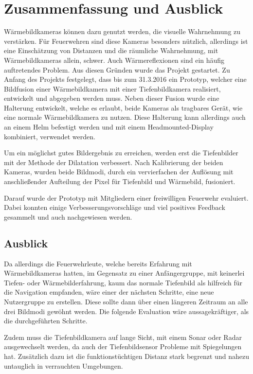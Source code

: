 
\chapter{Zusammenfassung und Ausblick}\label{chap:zusfas}
Wärmebildkameras können dazu genutzt werden, die visuelle Wahrnehmung zu verstärken.
Für Feuerwehren sind diese Kameras besonders nützlich, allerdings ist eine Einschätzung von Distanzen und die räumliche Wahrnehmung, mit Wärmebildkameras allein, schwer.
Auch Wärmereflexionen sind ein häufig auftretendes Problem.
Aus diesen Gründen wurde das Projekt \profire gestartet.
Zu Anfang des Projekts \profire festgelegt, dass bis zum 31.3.2016 ein Prototyp, welcher eine Bildfusion einer Wärmebildkamera mit einer Tiefenbildkamera realisiert, entwickelt und abgegeben werden muss.
Neben dieser Fusion wurde eine Halterung entwickelt, welche es erlaubt, beide Kameras als tragbares Gerät, wie eine normale Wärmebildkamera zu nutzen.
Diese Halterung kann allerdings auch an einem Helm befestigt werden und mit einem Headmounted-Display kombiniert, verwendet werden.

Um ein möglichst gutes Bildergebnis zu erreichen, werden erst die Tiefenbilder mit der Methode der Dilatation verbessert.
Nach Kalibrierung der beiden Kameras, wurden beide Bildmodi, durch ein vervierfachen der Auflösung mit anschließender Aufteilung der Pixel für Tiefenbild und Wärmebild, fusioniert.

Darauf wurde der Prototyp mit Mitgliedern einer freiwilligen Feuerwehr evaluiert.
Dabei konnten einige Verbesserungsvorschläge und viel positives Feedback gesammelt und auch nachgewiesen werden.

\section*{Ausblick}
Da allerdings die Feuerwehrleute, welche bereits Erfahrung mit Wärmebildkameras hatten, im Gegensatz zu einer Anfängergruppe, mit keinerlei Tiefen- oder Wärmebilderfahrung, kaum das normale Tiefenbild als hilfreich für die Navigation empfanden, wäre einer der nächsten Schritte, eine neue Nutzergruppe zu erstellen.
Diese sollte dann über einen längeren Zeitraum an alle drei Bildmodi gewöhnt werden.
Die folgende Evaluation wäre aussagekräftiger, als die durchgeführten Schritte.

Zudem muss die Tiefenbildkamera auf lange Sicht, mit einem Sonar oder Radar ausgewechselt werden, da auch der Tiefenbildsensor Probleme mit Spiegelungen hat.
Zusätzlich dazu ist die funktionstüchtigen Distanz stark begrenzt und nahezu untauglich in verrauchten Umgebungen.
